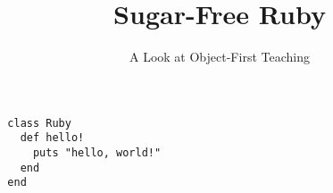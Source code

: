 \documentclass[14pt,final]{beamer}
\title{Sugar-Free Ruby}
\subtitle{A Look at Object-First Teaching}
\date{}
\begin{document}
\begin{frame}
	\titlepage
\end{frame}


\begin{frame}[fragile]
\begin{verbatim}
  class Ruby
    def hello!
      puts "hello, world!"
    end
  end
\end{verbatim}
\end{frame}
\end{document}
